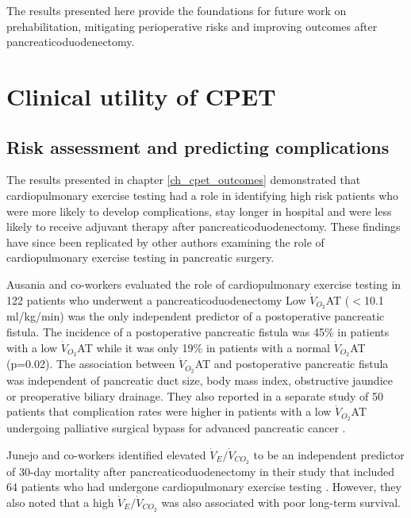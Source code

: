 The results presented here provide the foundations for future work on prehabilitation, mitigating perioperative risks and improving outcomes after pancreaticoduodenectomy.


\clearpage

\section{Clinical utility of CPET}

\subsection{Risk assessment and predicting complications}

The results presented in chapter \ref{ch_cpet_outcomes} demonstrated that cardiopulmonary exercise testing had a role in identifying high risk patients who were more likely to develop complications, stay longer in hospital and were less likely to receive adjuvant therapy after pancreaticoduodenectomy. 
These findings have since been replicated by other authors examining the role of cardiopulmonary exercise testing in pancreatic surgery. 

Ausania and co-workers evaluated the role of cardiopulmonary exercise testing in 122 patients who underwent a pancreaticoduodenectomy \parencite{ausania_effects_2012}
Low $\dot{V}_{O_2}$AT ($<$10.1 ml/kg/min) was the only independent predictor of a postoperative pancreatic fistula.
The incidence of a postoperative pancreatic fistula was 45\% in patients with a low $\dot{V}_{O_2}$AT while it was only 19\% in patients with a normal $\dot{V}_{O_2}$AT (p=0.02).
The association between $\dot{V}_{O_2}$AT and postoperative pancreatic fistula was independent of pancreatic duct size, body mass index, obstructive jaundice or preoperative biliary drainage.
They also reported in a separate study of 50 patients that complication  rates were higher in patients with a low $\dot{V}_{O_2}$AT undergoing palliative surgical bypass for advanced pancreatic cancer \parencite{ausania_double_2012}.

Junejo and co-workers identified elevated $\dot{V}_E/\dot{V}_{CO_2}$ to be an independent predictor of 30-day mortality after pancreaticoduodenectomy in their study that included 64 patients who had undergone cardiopulmonary exercise testing \parencite{junejo_cardiopulmonary_2014}.
However, they also noted that a high $\dot{V}_E/\dot{V}_{CO_2}$ was also associated with poor long-term survival.

